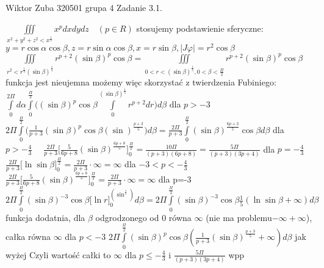 \documentclass{article}
\begin{document}
Wiktor Zuba 320501 grupa 4
\newline
Zadanie 3.1.
\newline



$
\iiint\limits_{x^2+y^2+z^2<x^\frac{1}{3}}x^pdxdydz\quad (p\in R)
$\newline
stosujemy podstawienie sferyczne:$y=r\cos{\alpha}\cos{\beta},z=r\sin{\alpha}\cos{\beta},x=r\sin{\beta},|J\varphi|=r^2\cos{\beta}$
$
\iiint\limits_{r^2<r^\frac{1}{3}(\sin{\beta})^\frac{1}{3}}r^{p+2}(\sin{\beta})^{p}\cos{\beta}
=
\iiint\limits_{0<r<(\sin{\beta})^\frac{1}{5},0<\beta<\frac{\Pi}{2}}r^{p+2}(\sin{\beta})^{p}\cos{\beta}
$
funkcja jest nieujemna możemy więc skorzystać z twierdzenia Fubiniego:
$
\int\limits_{0}^{2\Pi}d\alpha\int\limits_{0}^{\frac{\Pi}{2}}\bigl((\sin{\beta})^{p}\cos{\beta}\int\limits_{0}^{(\sin{\beta})^\frac{1}{5}}r^{p+2}dr\bigr)d\beta
$
dla $p>-3\quad$
$
2\Pi\int\limits_{0}^{\frac{\Pi}{2}}\bigl(\frac{1}{p+3}(\sin{\beta})^{p}\cos{\beta}(\sin)^\frac{p+3}{5}\bigr)d\beta
=
\frac{2\Pi}{p+3}\int\limits_{0}^{\frac{\Pi}{2}}(\sin{\beta})^\frac{6p+3}{5}\cos{\beta}d\beta
$\newline
dla $p>-\frac{4}{3}\quad$
$
\frac{2\Pi}{p+3}\bigl[\frac{5}{6p+8}(\sin{\beta})^\frac{6p+8}{5}\bigr]_{0}^{\frac{\Pi}{2}}
=
\frac{10\Pi}{(p+3)(6p+8)}
=
\frac{5\Pi}{(p+3)(3p+4)}
$\newline
dla $p=-\frac{4}{3}\quad$
$
\frac{2\Pi}{p+3}\bigl[\ln{\sin{\beta}}\bigr]_{0}^{\frac{\Pi}{2}}
=
\frac{2\Pi}{p+3}\cdot \infty
=
\infty
$\newline
dla $-3<p<-\frac{4}{3}$\quad
$
\frac{2\Pi}{p+3}\bigl[\frac{5}{6p+8}(\sin{\beta})^\frac{6p+8}{5}\bigr]_{0}^{\frac{\Pi}{2}}=\frac{2\Pi}{p+3}\cdot\infty=\infty
$\newline
dla p=-3\quad
$
2\Pi\int\limits_{0}^{\frac{\Pi}{2}}(\sin{\beta})^{-3}\cos{\beta}\bigl[\ln{r}\bigr]_{0}^{(\sin^\frac{1}{5})}d\beta
=
2\Pi\int\limits_{0}^{\frac{\Pi}{2}}(\sin{\beta})^{-3}\cos{\beta}\frac{1}{5}(\ln{\sin{\beta}}+\infty)d\beta
$
funkcja dodatnia, dla $\beta$ odgrodzonego od 0 równa $\infty$ (nie ma problemu$-\infty+\infty$),
całka równa $\infty$
\newline
dla $p<-3$\quad
$
2\Pi\int\limits_{0}^{\frac{\Pi}{2}}(\sin{\beta})^{p}\cos{\beta}(\frac{1}{p+3}(\sin{\beta})^\frac{p+3}{5}+\infty)d\beta
$ jak wyżej\newline
Czyli wartość całki to $\infty$ dla $p\le-\frac{4}{3}$ i $\frac{5\Pi}{(p+3)(3p+4)}$ wpp
\newline
\newline
\end{document}
